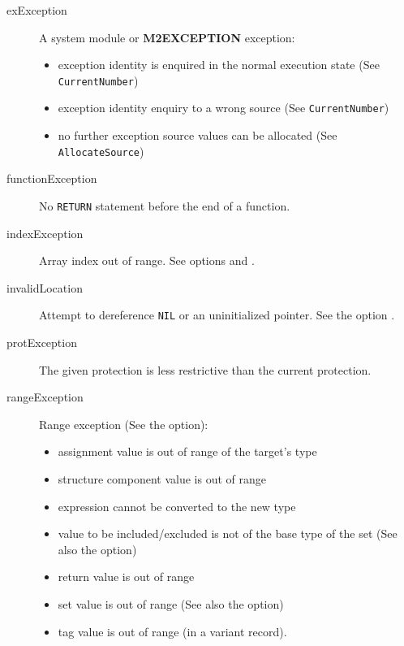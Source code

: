 \begin{description}
\item[exException] \mbox{}

        A system module 
        or {\bf M2EXCEPTION} exception:
        \begin{itemize}
        \item exception identity is enquired in the normal execution state
              (See {\tt CurrentNumber})
        \item exception identity enquiry to a wrong source
              (See {\tt CurrentNumber})
        \item no further exception source values can be allocated
              (See {\tt AllocateSource})
        \end{itemize}

\item[functionException] \mbox{}

        No \verb'RETURN' statement before the end of a function.

\item[indexException] \mbox{}

        Array index out of range.
        See options  and .

\item[invalidLocation] \mbox{}

        Attempt to dereference \verb'NIL' or an uninitialized pointer.
        See the option .

\item[protException] \mbox{}

        The given protection is less restrictive than the current protection.

\item[rangeException] \mbox{}

        Range exception (See the  option):
        \begin{itemize}
        \item assignment value is out of range of the target's type
        \item structure component value is out of range
        \item expression cannot be converted to the new type
        \item value to be included/excluded is not of the
              base type of the set (See also the  option)
        \item return value is out of range
        \item set value is out of range
              (See also the  option)
        \item tag value is out of range (in a variant record).
        \end{itemize}


\end{description}
